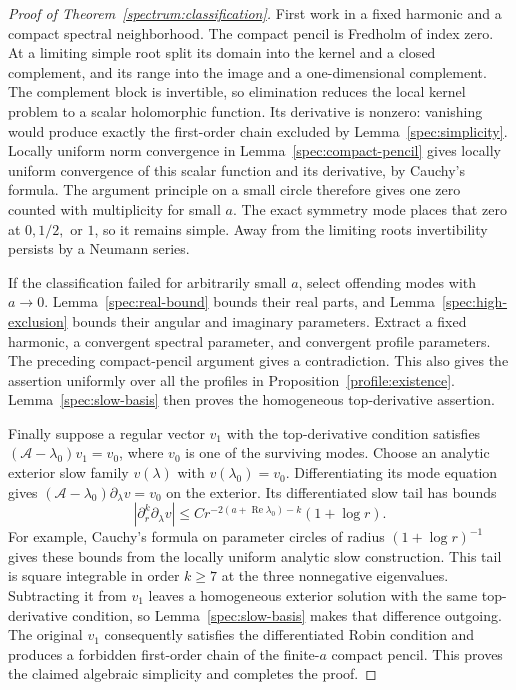 \begin{proof}[Proof of Theorem~\ref{spectrum:classification}]
First work in a fixed harmonic and a compact spectral neighborhood.
The compact pencil is Fredholm of index zero. At a limiting simple
root split its domain into the kernel and a closed complement, and
its range into the image and a one-dimensional complement. The
complement block is invertible, so elimination reduces the local
kernel problem to a scalar holomorphic function. Its derivative is
nonzero: vanishing would produce exactly the first-order chain
excluded by Lemma~\ref{spec:simplicity}. Locally uniform norm
convergence in Lemma~\ref{spec:compact-pencil} gives locally uniform
convergence of this scalar function and its derivative, by Cauchy's
formula. The argument principle on a small circle therefore gives
one zero counted with multiplicity for small $a$. The exact symmetry
mode places that zero at $0,1/2,$ or $1$, so it remains simple. Away
from the limiting roots invertibility persists by a Neumann series.

If the classification failed for arbitrarily small $a$, select
offending modes with $a\to0$. Lemma~\ref{spec:real-bound} bounds
their real parts, and Lemma~\ref{spec:high-exclusion} bounds their
angular and imaginary parameters. Extract a fixed harmonic, a
convergent spectral parameter, and convergent profile parameters.
The preceding compact-pencil argument gives a contradiction.
This also gives the assertion uniformly over all the profiles in
Proposition~\ref{profile:existence}. Lemma~\ref{spec:slow-basis}
then proves the homogeneous top-derivative assertion.

Finally suppose a regular vector $v_1$ with the top-derivative
condition satisfies $(\mathcal A-\lambda_0)v_1=v_0$, where $v_0$ is
one of the surviving modes. Choose an analytic exterior slow family
$v(\lambda)$ with $v(\lambda_0)=v_0$. Differentiating its mode
equation gives
$(\mathcal A-\lambda_0)\partial_\lambda v=v_0$ on the exterior.
Its differentiated slow tail has bounds
\[
 |\partial_r^k\partial_\lambda v|
 \le C r^{-2(a+\operatorname{Re}\lambda_0)-k}(1+\log r).
\]
For example, Cauchy's formula on parameter circles of radius
$(1+\log r)^{-1}$ gives these bounds from the locally uniform
analytic slow construction. This tail is square integrable in
order $k\ge7$ at the three nonnegative eigenvalues. Subtracting it
from $v_1$ leaves a homogeneous exterior solution with the same
top-derivative condition, so Lemma~\ref{spec:slow-basis} makes that
difference outgoing. The original $v_1$ consequently satisfies the
differentiated Robin condition and produces a forbidden first-order
chain of the finite-$a$ compact pencil. This proves the claimed
algebraic simplicity and completes the proof.
\end{proof}
